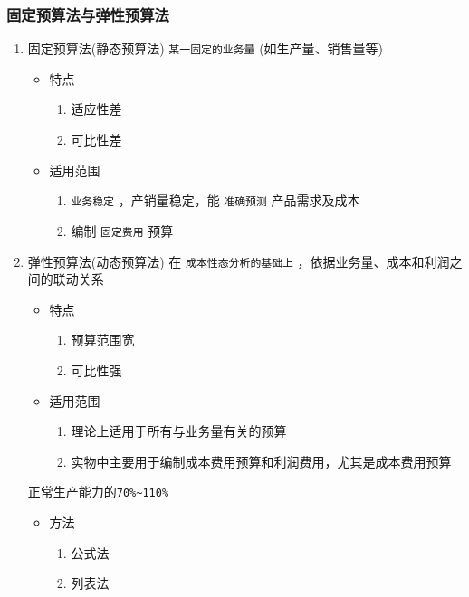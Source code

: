 \documentclass[11pt]{article}
\begin{document}
\subsubsection{固定预算法与弹性预算法}
\label{sec:org0e16d25}
\begin{enumerate}
\item 固定预算法(静态预算法)
\label{sec:orgb037cce}
\texttt{某一固定的业务量} (如生产量、销售量等)
\begin{itemize}
\item 特点
\begin{enumerate}
\item 适应性差
\item 可比性差
\end{enumerate}
\item 适用范围
\begin{enumerate}
\item \texttt{业务稳定} ，产销量稳定，能 \texttt{准确预测} 产品需求及成本
\item 编制 \texttt{固定费用} 预算
\end{enumerate}
\end{itemize}
\item 弹性预算法(动态预算法)
\label{sec:org58f8f2f}
在 \texttt{成本性态分析的基础上} ，依据业务量、成本和利润之间的联动关系
\begin{itemize}
\item 特点
\begin{enumerate}
\item 预算范围宽
\item 可比性强
\end{enumerate}
\item 适用范围
\begin{enumerate}
\item 理论上适用于所有与业务量有关的预算
\item 实物中主要用于编制成本费用预算和利润费用，尤其是成本费用预算
\end{enumerate}
\end{itemize}
正常生产能力的\texttt{70\%\textasciitilde{}110\%}
\begin{itemize}
\item 方法
\begin{enumerate}
\item 公式法
\item 列表法
\end{enumerate}
\end{itemize}
\end{enumerate}
\end{document}
